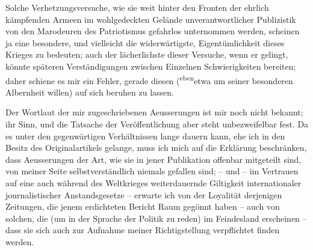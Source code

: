 \pstart
           Solche Verhetzungsversuche, wie sie weit hinter den Fronten der ehrlich kämpfenden
               Armeen im wohlgedeckten Gelände unverantwortlicher Publizistik von den Marodeuren des
               Patriotismus gefahrlos unternommen werden, scheinen ja eine besondere, und vielleicht
               die widerwärtigste, Eigentümlichkeit dieses Krieges zu bedeuten; auch der
               lächerlichste dieser Ver{\pb}suche, wenn er gelingt, könnte
               späteren Verständigungen zwischen Einzelnen Schwierigkeiten bereiten; daher schiene
               es mir ein Fehler, gerade diesen (\substVorne{}\textsuperscript{eben}\substDazwischen{}etwa\substHinten{} um seiner besonderen Albernheit willen) auf sich beruhen zu lassen.\pend
           
\pstart
           Der Wortlaut der mir zugeschriebenen Aeusserung\introOben{}en\introOben{} ist mir
               noch nicht bekannt; ihr Sinn, und die Tatsache der Veröffentlichung aber steht
               unbezweifelbar fest. Da es unter den gegenwärtigen Verhältnissen lange dauern kann,
               ehe ich in den Besitz des Originalartikels gelange, muss ich mich auf die Erklärung beschränken, dass
               Aeusserungen der Art, wie sie in jener Publikation offenbar mitgeteilt sind, von
               meiner Seite selbstverständlich niemals gefallen sind; – und – im Vertrauen auf eine
               auch während des Weltkrieges weiterdauernde Giltigkeit internationaler
               journalistischer Anstandsgesetze – erwarte ich von {\pb}der
               Loyalität derjenigen Zeitungen, die jenem erdichteten Bericht Raum gegönnt haben – auch von solchen, die (um in
               der Sprache der Politik zu reden) im Feindesland erscheinen – dass sie sich auch zur
               Aufnahme meiner Richtigstellung verpflichtet finden werden.\pend
           {\vspace{1\baselineskip}}
\pstart
